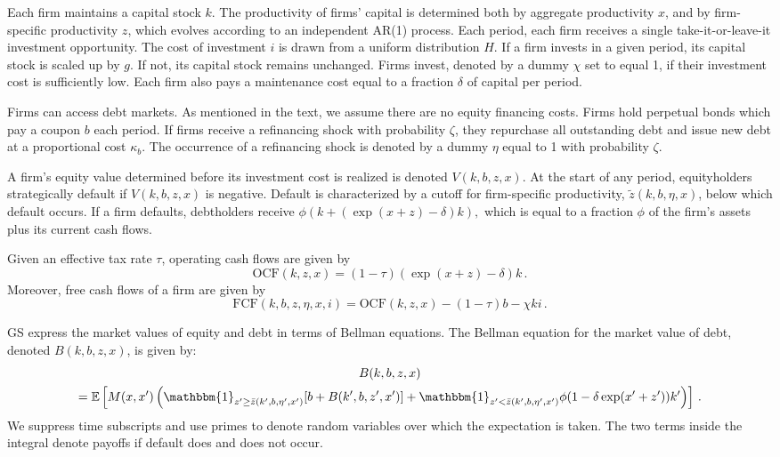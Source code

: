 \documentclass[12pt]{scrarticle}
\begin{document}
\begin{appendices}
Each firm maintains a capital stock $k$. The productivity of firms' capital is determined both by aggregate productivity $x$, and by firm-specific productivity $z$, which evolves according to an independent AR(1) process. Each period, each firm receives a single take-it-or-leave-it investment opportunity.  The cost of investment $i$ is drawn from a uniform distribution $H$. If a firm invests in a given period, its capital stock is scaled up by $g$. If not, its capital stock remains unchanged. Firms invest, denoted by a dummy $\chi$ set to equal 1, if their investment cost is sufficiently low. Each firm also pays a maintenance cost equal to a fraction $\delta$ of capital per period.

Firms can access debt markets. As mentioned in the text, we assume there are no equity financing costs. Firms hold perpetual bonds which pay a coupon $b$ each period. If firms receive a refinancing shock with probability $\zeta$, they repurchase all outstanding debt and issue new debt at a proportional cost $\kappa_b.$ The occurrence of a refinancing shock is denoted by a dummy $\eta$ equal to 1 with probability $\zeta$.

A firm's equity value determined before its investment cost is realized is denoted $V(k, b, z, x)$. At the start of any period, equityholders strategically default if $V(k, b, z, x)$ is negative. Default is characterized by a cutoff for firm-specific productivity, $\tilde z(k, b, \eta, x)$, below which default occurs. If a firm defaults, debtholders receive $\phi (k + (\exp(x + z) - \delta) k),$ which is equal to a fraction $\phi$ of the firm's assets plus its current cash flows.

Given an effective tax rate $\tau$, operating cash flows are given by \[
\text{OCF}(k, z, x) = (1 - \tau) (\exp(x + z) - \delta)k\, .
\]
Moreover, free cash flows of a firm are given by \[
\text{FCF}(k, b, z, \eta, x, i) = \text{OCF}(k, z, x) - (1 - \tau) b -  \chi k i\, . 
\]

GS express the market values of equity and debt in terms of Bellman equations. The Bellman equation for the market value of debt, denoted $B(k, b, z, x)$, is given by:
\begin{multline*}
B(k, b, z,x) \\
= \mathbb{E} \left[ M(x, x')\left(\mathbbm{1}_{z' \geq \bar z(k', b, \eta', x')} [b + B(k', b, z', x')] + \mathbbm{1}_{z' < \bar z(k', b, \eta', x')} \phi (1 - \delta \exp(x' + z')) k'\right) \right]\,.
\end{multline*}
We suppress time subscripts and use primes to denote random variables over which the expectation is taken. The two terms inside the integral denote payoffs if default does and does not occur. 


\end{appendices}
\end{document}
